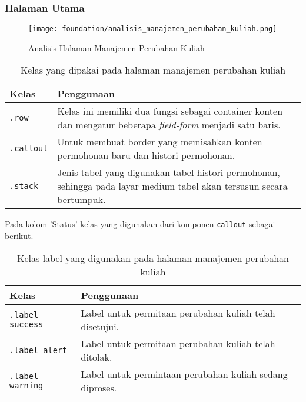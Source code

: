 \subsubsection{Halaman Utama}
\begin{figure} [H]
	\centering  
	\texttt{[image: foundation/analisis\_manajemen\_perubahan\_kuliah.png]}
	\caption{Analisis Halaman Manajemen Perubahan Kuliah}
\end{figure}
\begin{table}[H]
	\centering
	\begin{tabularx}{\textwidth}{lX}
		\toprule
		Kelas     & Penggunaan \\
		\midrule
		\texttt{.row} & Kelas ini memiliki dua fungsi sebagai container konten dan mengatur beberapa \textit{field-form} menjadi satu baris.\\ 
		\texttt{.callout} & Untuk membuat border yang memisahkan konten permohonan baru dan histori permohonan.\\
		\texttt{.stack} & Jenis tabel yang digunakan tabel histori permohonan, sehingga pada layar medium tabel akan tersusun secara bertumpuk.\\
		\bottomrule
	\end{tabularx}%
	\caption{Kelas yang dipakai pada halaman manajemen perubahan kuliah}
\end{table}

\noindent Pada kolom 'Status' kelas yang digunakan dari komponen \texttt{callout} sebagai berikut.
\begin{table}[H]
	\centering
	\begin{tabularx}{\textwidth}{lX}
		\toprule
		Kelas     & Penggunaan \\
		\midrule
		\texttt{.label success} & Label untuk permitaan perubahan kuliah telah disetujui.\\
		\texttt{.label alert} &  Label untuk permitaan perubahan kuliah telah ditolak.\\
		\texttt{.label warning} & Label untuk permintaan perubahan kuliah sedang diproses.\\
		\bottomrule
	\end{tabularx}%
	\caption{Kelas label yang digunakan pada halaman manajemen perubahan kuliah}
\end{table}\\

